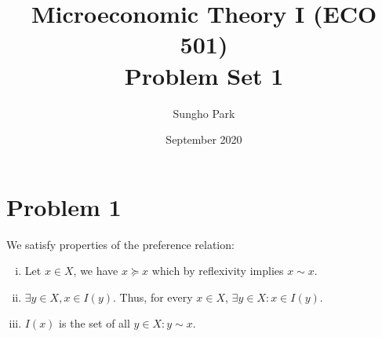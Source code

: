 \documentclass{article}
\title{\textbf{Microeconomic Theory I (ECO 501)} \\ Problem Set 1}
\author{Sungho Park}
\date{September 2020}
\begin{document}
\maketitle

\section*{Problem 1}
We satisfy properties of the preference relation: 
\begin{enumerate}[(i)]
    \item Let $x\in X$, we have $x\succeq x$ which by reflexivity implies $x\sim x$. 
    \item $\exists y\in X, x\in I(y)$. Thus, for every $x\in X$, $\exists y\in X: x\in I(y)$.
    \item  $I(x)$ is the set of all $y\in X:y\sim x$.
\end{enumerate}
\end{document}
